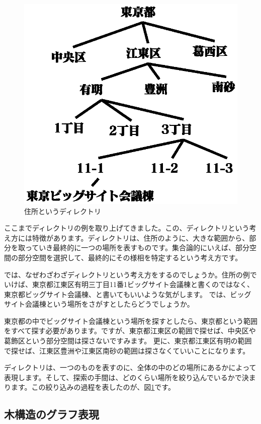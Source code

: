 \begin{figure}[htbp]
	\includegraphics[width=12cm,clip]{draw/tokyo.eps}
	\caption{住所というディレクトリ}
	\label{fig:address}
\end{figure}


ここまでディレクトリの例を取り上げてきました。この、ディレクトリという考え方には特徴があります。ディレクトリは、住所のように、大きな範囲から、部分を取っていき最終的に一つの場所を表すものです。集合論的にいえば、部分空間の部分空間を選択して、最終的にその様相を特定するという考え方です。

では、なぜわざわざディレクトリという考え方をするのでしょうか。住所の例でいけば、東京都江東区有明三丁目11番1ビッグサイト会議棟と書くのではなく、東京都ビッグサイト会議棟、と書いてもいいような気がします。
では、ビッグサイト会議棟という場所をさがすとしたらどうでしょうか。

東京都の中でビッグサイト会議棟という場所を探すとしたら、東京都という範囲をすべて探す必要があります。ですが、東京都江東区の範囲で探せば、中央区や葛飾区という部分空間は探さないですみます。
更に、東京都江東区有明の範囲で探せば、江東区豊洲や江東区南砂の範囲は探さなくていいことになります。

ディレクトリは、一つのものを表すのに、全体の中のどの場所にあるかによって表現します。そして、探索の手間は、どのくらい場所を絞り込んでいるかで決まります。この絞り込みの過程を表したのが、図\ref{fig:address}です。


\subsection{木構造のグラフ表現}

